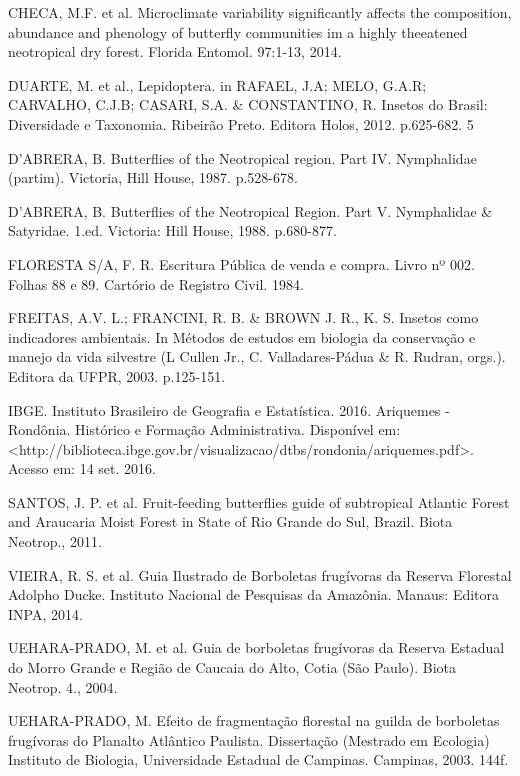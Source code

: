 \documentclass[article,12pt,onesidea,4paper,english,brazil]{abntex2}
\begin{document}
	\noindent CHECA, M.F. et al. Microclimate variability significantly affects the composition, abundance and phenology of butterfly communities im a highly theeatened neotropical dry forest. Florida Entomol. 97:1-13, 2014.
	
	\noindent	DUARTE, M. et al., Lepidoptera. in RAFAEL, J.A; MELO, G.A.R; CARVALHO, C.J.B;
	CASARI, S.A. & CONSTANTINO, R. Insetos do Brasil: Diversidade e Taxonomia. Ribeirão Preto. Editora Holos, 2012. p.625-682.
	5
	
	\noindent D’ABRERA, B. Butterflies of the Neotropical region. Part IV. Nymphalidae (partim). Victoria, Hill House, 1987. p.528-678.
	
	\noindent D’ABRERA, B. Butterflies of the Neotropical Region. Part V. Nymphalidae & Satyridae. 1.ed. Victoria: Hill House, 1988. p.680-877.
	
	\noindent FLORESTA S/A, F. R. Escritura Pública de venda e compra. Livro nº 002. Folhas 88 e 89. Cartório de Registro Civil. 1984.
	
	\noindent FREITAS, A.V. L.; FRANCINI, R. B. & BROWN J. R., K. S. Insetos como indicadores ambientais. In Métodos de estudos em biologia da conservação e manejo da vida silvestre (L Cullen Jr., C. Valladares-Pádua & R. Rudran, orgs.). Editora da UFPR, 2003. p.125-151.
	
	\noindent IBGE. Instituto Brasileiro de Geografia e Estatística. 2016. Ariquemes - Rondônia. Histórico e Formação Administrativa. Disponível em:
	<http://biblioteca.ibge.gov.br/visualizacao/dtbs/rondonia/ariquemes.pdf>. Acesso em: 14 set. 2016.
	
	\noindent SANTOS, J. P. et al. Fruit-feeding butterflies guide of subtropical Atlantic Forest and Araucaria Moist Forest in State of Rio Grande do Sul, Brazil. Biota Neotrop., 2011.
	
	\noindent VIEIRA, R. S. et al. Guia Ilustrado de Borboletas frugívoras da Reserva Florestal Adolpho Ducke. Instituto Nacional de Pesquisas da Amazônia. Manaus: Editora INPA, 2014.
	
	\noindent UEHARA-PRADO, M. et al. Guia de borboletas frugívoras da Reserva Estadual do Morro Grande e Região de Caucaia do Alto, Cotia (São Paulo). Biota Neotrop. 4., 2004.
	
	\noindent UEHARA-PRADO, M. Efeito de fragmentação florestal na guilda de borboletas frugívoras do Planalto Atlântico Paulista. Dissertação (Mestrado em Ecologia) Instituto de Biologia, Universidade Estadual de Campinas. Campinas, 2003. 144f.
	
\end{document}
